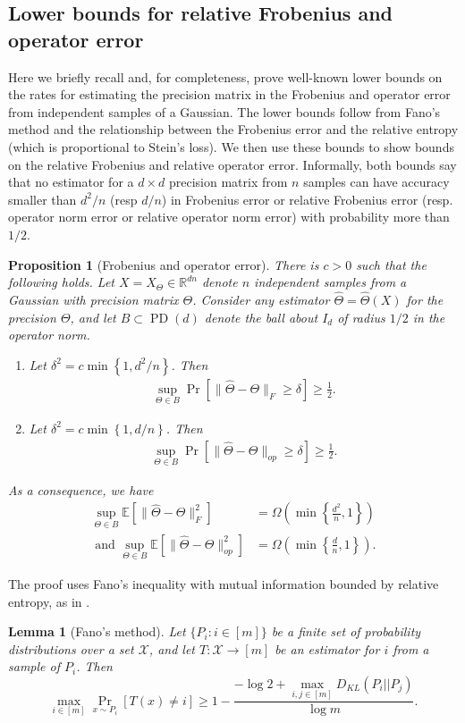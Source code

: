 \documentclass[aos]{imsart}
\newtheorem{prop}[theorem]{Proposition}
\newtheorem{lemma}[theorem]{Lemma}
\theoremstyle{definition}
\numberwithin{equation}{section}
\DeclareMathOperator{\PD}{PD}
\newcommand{\R}{{\mathbb{R}}}
\newcommand{\htheta}{\widehat{\Theta}}
\newcommand{\E}{\mathbb{E}}
\newcommand{\CF}[1]{{\color{purple}[CF: #1]}}
\begin{document}
\subsection{Lower bounds for relative Frobenius and operator error}
Here we briefly recall and, for completeness, prove well-known lower bounds on the rates for estimating the precision matrix in the Frobenius and operator error from independent samples of a Gaussian. The lower bounds follow from Fano's method and the relationship between the Frobenius error and the relative entropy (which is proportional to Stein's loss). We then use these bounds to show bounds on the relative Frobenius and relative operator error. Informally, both bounds say that no estimator for a $d\times d$ precision matrix from $n$ samples can have accuracy smaller than $d^2/n$ (resp $d/n$) in Frobenius error or relative Frobenius error (resp. operator norm error or relative operator norm error) with probability more than $1/2$.


\begin{prop}[Frobenius and operator error]\label{prp:standard-lower}
There is $c > 0$ such that the following holds. Let $X = X_{\Theta} \in \R^{dn}$ denote $n$ independent samples from a Gaussian with precision matrix $\Theta$. Consider any estimator $\htheta = \htheta(X)$ for the precision $\Theta$, and let $B\subset \PD(d)$ denote the ball about $I_d$ of radius $1/2$ in the operator norm.
\begin{enumerate}
\item Let $\delta^2 = c\min \left\{1,d^2/n\right\}$. Then
\begin{align}
\sup_{\Theta \in B} \Pr\left[ \| \htheta - \Theta\|_F \geq \delta\right] \geq \frac{1}{2}.\label{eq:frob-lower}
\end{align}
\item Let $\delta^2 = c\min \left\{1,d/n\right\}$. Then
 \begin{align}
\sup_{\Theta \in B} \Pr\left[ \| \htheta - \Theta\|_{op} \geq \delta\right] \geq \frac{1}{2}. \label{eq:op-lower}
\end{align}
\end{enumerate}
As a consequence, we have 
\begin{align*}\sup_{\Theta \in B}\E[\| \htheta - \Theta\|_F^2] &=\Omega\left( \min \left\{\frac{d^2}{n},1\right\}\right)\\
\text{ and } \sup_{\Theta \in B}\E[\| \htheta - \Theta\|_{op}^2] &= \Omega\left( \min \left\{\frac{d}{n},1\right\}\right).\end{align*}
\end{prop}
The proof uses Fano's inequality with mutual information bounded by relative entropy, as in \cite{yang1999information}.
\begin{lemma}[Fano's method]
Let $\{P_i: i \in [m]\}$ be a finite set of probability distributions over a set $\mathcal X$, and let $T: \mathcal X \to [m]$ be an estimator for $i$ from a sample of $P_i$. Then 
$$ \max_{i\in [m]} \Pr_{x \sim P_i}[T(x) \neq i] \geq 1 - \frac{ - \log 2 + \max_{i,j \in [m]} D_{KL}(P_i|| P_j)}{\log m}.$$
\end{lemma}
\end{document}
